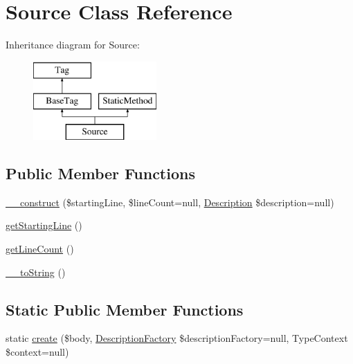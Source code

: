 \hypertarget{classphp_documentor_1_1_reflection_1_1_doc_block_1_1_tags_1_1_source}{}\section{Source Class Reference}
\label{classphp_documentor_1_1_reflection_1_1_doc_block_1_1_tags_1_1_source}
Inheritance diagram for Source\+:\begin{figure}[H]
\begin{center}
\leavevmode
\includegraphics[height=3.000000cm]{classphp_documentor_1_1_reflection_1_1_doc_block_1_1_tags_1_1_source}
\end{center}
\end{figure}
\subsection*{Public Member Functions}
\begin{DoxyCompactItemize}
\item 
\mbox{\hyperlink{classphp_documentor_1_1_reflection_1_1_doc_block_1_1_tags_1_1_source_a252b8c9d51ae92265c6914af8a4239b0}{\+\_\+\+\_\+construct}} (\$starting\+Line, \$line\+Count=null, \mbox{\hyperlink{classphp_documentor_1_1_reflection_1_1_doc_block_1_1_description}{Description}} \$description=null)
\item 
\mbox{\hyperlink{classphp_documentor_1_1_reflection_1_1_doc_block_1_1_tags_1_1_source_a59179ee45a85a9b98184c48a661716cf}{get\+Starting\+Line}} ()
\item 
\mbox{\hyperlink{classphp_documentor_1_1_reflection_1_1_doc_block_1_1_tags_1_1_source_a450c14c12a0570ed4365996d6e5a9ae5}{get\+Line\+Count}} ()
\item 
\mbox{\hyperlink{classphp_documentor_1_1_reflection_1_1_doc_block_1_1_tags_1_1_source_a7516ca30af0db3cdbf9a7739b48ce91d}{\+\_\+\+\_\+to\+String}} ()
\end{DoxyCompactItemize}
\subsection*{Static Public Member Functions}
\begin{DoxyCompactItemize}
\item 
static \mbox{\hyperlink{classphp_documentor_1_1_reflection_1_1_doc_block_1_1_tags_1_1_source_a11e724d29317978c2b5add32da21a158}{create}} (\$body, \mbox{\hyperlink{classphp_documentor_1_1_reflection_1_1_doc_block_1_1_description_factory}{Description\+Factory}} \$description\+Factory=null, Type\+Context \$context=null)
\end{DoxyCompactItemize}

